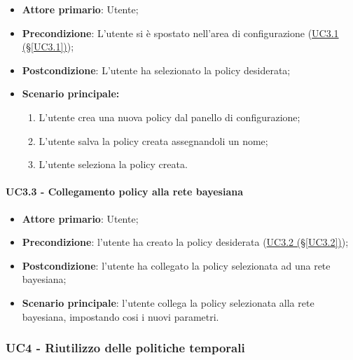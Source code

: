 \begin{itemize}
	\item \textbf{Attore primario}: Utente; 
	\item \textbf{Precondizione}: L'utente si è spostato nell'area di configurazione (\hyperref[UC3.1]{UC3.1 (§\ref*{UC3.1})});
	\item \textbf{Postcondizione}: L'utente ha selezionato la policy desiderata;
	\item \textbf{Scenario principale:}

	\begin{enumerate}
		\item L'utente crea una nuova policy dal panello di configurazione;
		\item L'utente salva la policy creata assegnandoli un nome; 
		\item L'utente seleziona la policy creata.
	\end{enumerate}
	
\end{itemize}

\paragraph{UC3.3 - Collegamento policy alla rete bayesiana}\label{UC3.3}
\begin{itemize}
	\item \textbf{Attore primario}: Utente; 
	\item \textbf{Precondizione}: l'utente ha creato la policy desiderata (\hyperref[UC3.2]{UC3.2 (§\ref*{UC3.2})});
	\item \textbf{Postcondizione}: l'utente ha collegato la policy selezionata ad una rete bayesiana; 
	\item \textbf{Scenario principale}: l'utente collega la policy selezionata alla rete bayesiana, impostando cosi i nuovi parametri. 
\end{itemize}

\newpage

\subsubsection{UC4 - Riutilizzo delle politiche temporali}
\label{UC4}


